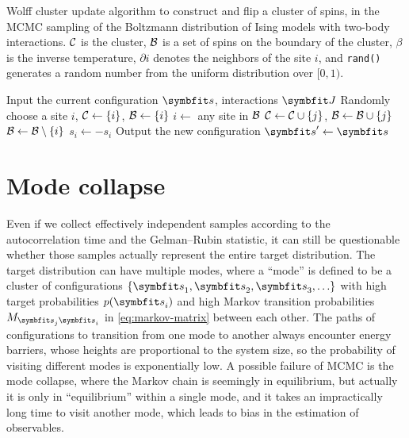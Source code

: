 \begin{algorithm}[H]
\caption[Wolff cluster update]{
Wolff cluster update algorithm to construct and flip a cluster of spins, in the MCMC sampling of the Boltzmann distribution of Ising models with two-body interactions.
$\mathcal{C}$ is the cluster, $\mathcal{B}$ is a set of spins on the boundary of the cluster, $\beta$ is the inverse temperature, $\partial i$ denotes the neighbors of the site $i$, and \texttt{rand()} generates a random number from the uniform distribution over $[0, 1)$.
}
\label{alg:wolff}
\begin{algorithmic}[1]
\STATE Input the current configuration $\vs$, interactions $\mJ$
\STATE Randomly choose a site $i$, $\mathcal{C} \gets \{i\}$, $\mathcal{B} \gets \{i\}$
\WHILE{$\calB \neq \emptyset$}
    \STATE $i \gets$ any site in $\mathcal{B}$
            \STATE $\mathcal{C} \gets \mathcal{C} \cup \{j\}$, $\mathcal{B} \gets \mathcal{B} \cup \{j\}$
        \ENDIF
    \ENDFOR
    \STATE $\mathcal{B} \gets \mathcal{B} \setminus \{i\}$
\ENDWHILE
{}
    \STATE $s_i \gets -s_i$
\ENDFOR
\STATE Output the new configuration $\vs' \gets \vs$
\end{algorithmic}
\end{algorithm}

\section{Mode collapse}
\label{sec:mode-collapse}

Even if we collect effectively independent samples according to the autocorrelation time and the Gelman--Rubin statistic, it can still be questionable whether those samples actually represent the entire target distribution. The target distribution can have multiple modes, where a ``mode'' is defined to be a cluster of configurations $\{\vs_1, \vs_2, \vs_3, \ldots\}$ with high target probabilities $p(\vs_i)$ and high Markov transition probabilities $M_{\vs_j \vs_i}$ in \cref{eq:markov-matrix} between each other. The paths of configurations to transition from one mode to another always encounter energy barriers, whose heights are proportional to the system size, so the probability of visiting different modes is exponentially low. A possible failure of MCMC is the mode collapse, where the Markov chain is seemingly in equilibrium, but actually it is only in ``equilibrium'' within a single mode, and it takes an impractically long time to visit another mode, which leads to bias in the estimation of observables.


